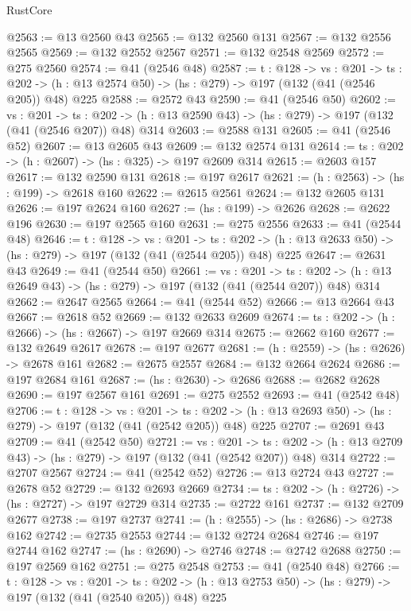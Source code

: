 \begin{lexlean}{RustCore}
\begin{coremodule}
@2563 := @13 @2560 @43
@2565 := @132 @2560 @131
@2567 := @132 @2556 @2565
@2569 := @132 @2552 @2567
@2571 := @132 @2548 @2569
@2572 := @275 @2560
@2574 := @41 (@2546 @48)
@2587 := {t : @128} ->
  {vs : @201} ->
  {ts : @202} -> (h : @13 @2574 @50) -> (hs : @279) -> @197 (@132 (@41 (@2546 @205)) @48) @225
@2588 := @2572 @43
@2590 := @41 (@2546 @50)
@2602 := {vs : @201} ->
  {ts : @202} -> (h : @13 @2590 @43) -> (hs : @279) -> @197 (@132 (@41 (@2546 @207)) @48) @314
@2603 := @2588 @131
@2605 := @41 (@2546 @52)
@2607 := @13 @2605 @43
@2609 := @132 @2574 @131
@2614 := {ts : @202} -> (h : @2607) -> (hs : @325) -> @197 @2609 @314
@2615 := @2603 @157
@2617 := @132 @2590 @131
@2618 := @197 @2617
@2621 := (h : @2563) -> (hs : @199) -> @2618 @160
@2622 := @2615 @2561
@2624 := @132 @2605 @131
@2626 := @197 @2624 @160
@2627 := (hs : @199) -> @2626
@2628 := @2622 @196
@2630 := @197 @2565 @160
@2631 := @275 @2556
@2633 := @41 (@2544 @48)
@2646 := {t : @128} ->
  {vs : @201} ->
  {ts : @202} -> (h : @13 @2633 @50) -> (hs : @279) -> @197 (@132 (@41 (@2544 @205)) @48) @225
@2647 := @2631 @43
@2649 := @41 (@2544 @50)
@2661 := {vs : @201} ->
  {ts : @202} -> (h : @13 @2649 @43) -> (hs : @279) -> @197 (@132 (@41 (@2544 @207)) @48) @314
@2662 := @2647 @2565
@2664 := @41 (@2544 @52)
@2666 := @13 @2664 @43
@2667 := @2618 @52
@2669 := @132 @2633 @2609
@2674 := {ts : @202} -> (h : @2666) -> (hs : @2667) -> @197 @2669 @314
@2675 := @2662 @160
@2677 := @132 @2649 @2617
@2678 := @197 @2677
@2681 := (h : @2559) -> (hs : @2626) -> @2678 @161
@2682 := @2675 @2557
@2684 := @132 @2664 @2624
@2686 := @197 @2684 @161
@2687 := (hs : @2630) -> @2686
@2688 := @2682 @2628
@2690 := @197 @2567 @161
@2691 := @275 @2552
@2693 := @41 (@2542 @48)
@2706 := {t : @128} ->
  {vs : @201} ->
  {ts : @202} -> (h : @13 @2693 @50) -> (hs : @279) -> @197 (@132 (@41 (@2542 @205)) @48) @225
@2707 := @2691 @43
@2709 := @41 (@2542 @50)
@2721 := {vs : @201} ->
  {ts : @202} -> (h : @13 @2709 @43) -> (hs : @279) -> @197 (@132 (@41 (@2542 @207)) @48) @314
@2722 := @2707 @2567
@2724 := @41 (@2542 @52)
@2726 := @13 @2724 @43
@2727 := @2678 @52
@2729 := @132 @2693 @2669
@2734 := {ts : @202} -> (h : @2726) -> (hs : @2727) -> @197 @2729 @314
@2735 := @2722 @161
@2737 := @132 @2709 @2677
@2738 := @197 @2737
@2741 := (h : @2555) -> (hs : @2686) -> @2738 @162
@2742 := @2735 @2553
@2744 := @132 @2724 @2684
@2746 := @197 @2744 @162
@2747 := (hs : @2690) -> @2746
@2748 := @2742 @2688
@2750 := @197 @2569 @162
@2751 := @275 @2548
@2753 := @41 (@2540 @48)
@2766 := {t : @128} ->
  {vs : @201} ->
  {ts : @202} -> (h : @13 @2753 @50) -> (hs : @279) -> @197 (@132 (@41 (@2540 @205)) @48) @225

\end{coremodule}
\end{lexlean}
